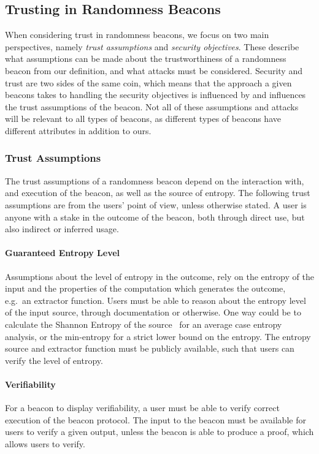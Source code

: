 \subsection{Trusting in Randomness Beacons}
When considering trust in randomness beacons, we focus on two main perspectives, namely \emph{trust assumptions} and \emph{security objectives}.
These describe what assumptions can be made about the trustworthiness of a randomness beacon from our definition, and what attacks must be considered.
Security and trust are two sides of the same coin, which means that the approach a given beacons takes to handling the security objectives is influenced by and influences the trust assumptions of the beacon.
Not all of these assumptions and attacks will be relevant to all types of beacons, as different types of beacons have different attributes in addition to ours.

\subsubsection{Trust Assumptions}\label{ssub:trust_assumptions}
The trust assumptions of a randomness beacon depend on the interaction with, and execution of the beacon, as well as the source of entropy.
The following trust assumptions are from the users' point of view, unless otherwise stated.
A user is anyone with a stake in the outcome of the beacon, both through direct use, but also indirect or inferred usage.

\paragraph{Guaranteed Entropy Level}
    Assumptions about the level of entropy in the outcome, rely on the entropy of the input and the properties of the computation which generates the outcome, e.g.\ an extractor function.
    Users must be able to reason about the entropy level of the input source, through documentation or otherwise.
    One way could be to calculate the Shannon Entropy of the source~\cite{informationtheory} for an average case entropy analysis, or the min-entropy for a strict lower bound on the entropy.
    The entropy source and extractor function must be publicly available, such that users can verify the level of entropy.

\paragraph{Verifiability}
    For a beacon to display verifiability, a user must be able to verify correct execution of the beacon protocol.
    The input to the beacon must be available for users to verify a given output, unless the beacon is able to produce a proof, which allows users to verify.

